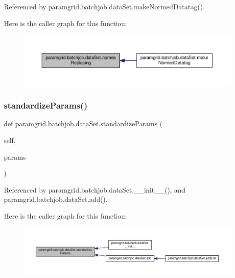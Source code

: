 Referenced by paramgrid.\+batchjob.\+data\+Set.\+make\+Normed\+Datatag().

Here is the caller graph for this function\+:
\nopagebreak
\begin{figure}[H]
\begin{center}
\leavevmode
\includegraphics[width=350pt]{classparamgrid_1_1batchjob_1_1dataSet_a1f3cc42154d9d4a05b363c1d98e329aa_icgraph}
\end{center}
\end{figure}
\mbox{\label{classparamgrid_1_1batchjob_1_1dataSet_ae3061be783f0b4855bc64cd8b4f326e8}} 
\subsubsection{\texorpdfstring{standardize\+Params()}{standardizeParams()}}
{\footnotesize\ttfamily def paramgrid.\+batchjob.\+data\+Set.\+standardize\+Params (\begin{DoxyParamCaption}\item[{}]{self,  }\item[{}]{params }\end{DoxyParamCaption})}



Referenced by paramgrid.\+batchjob.\+data\+Set.\+\_\+\+\_\+init\+\_\+\+\_\+(), and paramgrid.\+batchjob.\+data\+Set.\+add().

Here is the caller graph for this function\+:
\nopagebreak
\begin{figure}[H]
\begin{center}
\leavevmode
\includegraphics[width=350pt]{classparamgrid_1_1batchjob_1_1dataSet_ae3061be783f0b4855bc64cd8b4f326e8_icgraph}
\end{center}
\end{figure}
\mbox{\label{classparamgrid_1_1batchjob_1_1dataSet_a8d7d924f1dccda6288c02ce9a294d5a2}} 

